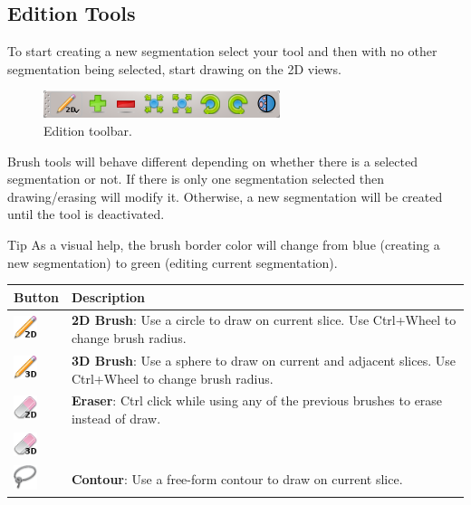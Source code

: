 \subsection{Edition Tools}
To start creating a new segmentation select your tool and then with no other
segmentation being selected, start drawing on the 2D views.

\begin{figure}[H]
\centering
\includegraphics{fig/EditorToolbar}
\caption{Edition toolbar.}
\end{figure}

Brush tools will behave different depending on whether there is a selected
segmentation or not. If there is only one segmentation selected then
drawing/erasing will modify it. Otherwise, a new segmentation will be created
until the tool is deactivated. \\

\begin{bclogo}[couleur = yellow!33, logo= \bcbook]
{Tip} As a visual help, the brush border color will change from blue (creating a
new segmentation) to green (editing current segmentation). 
\end{bclogo}
\vspace{0.3cm}

\begin{tabular}{| m{1.3cm} | m{13.5cm} |}
\hline
\textbf{Button} & \textbf{Description}\\
\hline
\includegraphics[width=0.7cm]{../../frontend/rsc/pencil2D} &
\textbf{2D Brush}: Use a circle to draw on current slice. Use Ctrl+Wheel to
change brush radius.\\
\hline
\includegraphics[width=0.7cm]{../../frontend/rsc/pencil3D} &
\textbf{3D Brush}: Use a sphere to draw on current and adjacent slices. Use
Ctrl+Wheel to change brush radius.\\
\hline
\includegraphics[width=0.7cm]{../../frontend/rsc/eraser2D} &
\textbf{Eraser}: Ctrl click while using any of the previous brushes to erase
instead of draw.\\
\includegraphics[width=0.7cm]{../../frontend/rsc/eraser3D} & \\
\hline
\includegraphics[width=0.7cm]{../../frontend/rsc/lasso} &
\textbf{Contour}: Use a free-form contour to draw on current slice.\\
\hline
\end{tabular}
\vspace{0.3cm}

